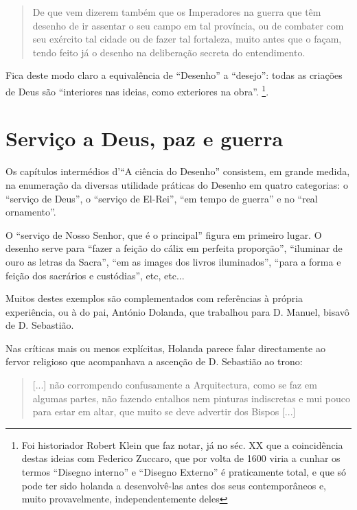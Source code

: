 \documentclass{article}
\begin{document}
\begin{quote}
  De que vem dizerem também que os Imperadores na guerra que têm
  desenho de ir assentar o seu campo em tal província, ou de combater
  com seu exército tal cidade ou de fazer tal fortaleza, muito antes
  que o façam, tendo feito já o desenho na deliberação secreta do
  entendimento.
\end{quote}\cite[fl.37v]{holanda}

Fica deste modo claro a equivalência de ``Desenho'' a ``desejo'':
todas as criações de Deus são ``interiores nas ideias, como exteriores
na obra''\cite[fl.37v]{holanda}. \footnote{Foi historiador Robert
  Klein que faz notar, já no séc. XX que a coincidência destas ideias
  com Federico Zuccaro, que por volta de 1600 viria a cunhar os termos
  ``Disegno interno'' e ``Disegno Externo'' é praticamente total, e
  que só pode ter sido holanda a desenvolvê-las antes dos seus
  contemporâneos e, muito provavelmente, independentemente deles}.

\section{Serviço a Deus, paz e guerra }

Os capítulos intermédios d'``A ciência do Desenho'' consistem, em
grande medida, na enumeração da diversas utilidade práticas do Desenho
em quatro categorias: o ``serviço de Deus'', o ``serviço de El-Rei'',
``em tempo de guerra'' e no ``real ornamento''.

O ``serviço de Nosso Senhor, que é o principal''\cite[fl.38r]{holanda}
figura em primeiro lugar. O desenho serve para ``fazer a feição do
cálix em perfeita proporção'', ``iluminar de ouro as letras da
Sacra'', ``em as images dos livros iluminados'', ``para a forma e
feição dos sacrários e custódias'', etc, etc...

Muitos destes exemplos são complementados com referências à própria
experiência, ou à do pai, António Dolanda, que trabalhou para
D. Manuel, bisavô de D. Sebastião.

Nas críticas mais ou menos explícitas, Holanda parece falar
directamente ao fervor religioso que acompanhava a ascenção de
D. Sebastião ao trono:

\begin{quote}
  [...] não corrompendo confusamente a Arquitectura, como se faz em
  algumas partes, não fazendo entalhos nem pinturas indiscretas e mui
  pouco para estar em altar, que muito se deve advertir dos Bispos
  [...] 
\end{quote}
\end{document}
